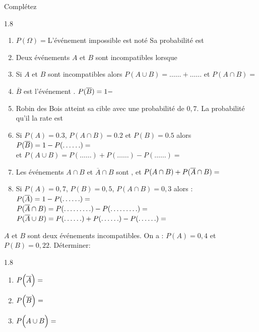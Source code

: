 \documentclass[main.tex]{subfiles}
\begin{document}
\begin{exercise}Complétez \vspace{-0.75em}
\begin{spacing}{1.8}
	\begin{enumerate}[label=\arabic*), leftmargin=*]
		\item $P(\Omega)=$\dotfill L'événement impossible est noté \dotfill Sa probabilité est \dotfill
		\item Deux événements $A$ et $B$ sont incompatibles lorsque \dotfill
		\item Si $A$ et $B$ sont incompatibles alors $P(A\cup B)=\ldots\ldots+\ldots\ldots$ et $P(A\cap B)=$\dotfill 
		\item $\overline{B}$ est l'événement \dotfill. $P(\overline{B})=1-\dotfill$ 
		\item 	Robin des Bois atteint sa cible avec une probabilité de $0,7$. La probabilité qu'il la rate est \dotfill 
		\item Si $P(A)=0.3$, $P(A\cap B)=0.2$  et $P(B)=0.5$  alors \\
		$P(\overline{B})=1-P(\ldots\ldots)=\dotfill$\\
		et  $P(A\cup B)=P(\ldots\ldots) + P(\ldots\ldots) - P(\ldots\ldots)=$\dotfill  
		\item Les événements $A\cap B$ et $\overline{A}\cap B$ sont \dotfill, et $P(A\cap B)+P(\overline{A}\cap B)=\dotfill $
		\item Si $P(A)=0,7$, $P(B)=0,5$, $P(A\cap B)=0,3$ alors :\\ $P(\overline{A})=1-P(\ldots\ldots)=\dotfill$\\
		$P(\overline{A}\cap B)=P(\ldots\ldots\ldots)-P(\ldots\ldots\ldots) =\dotfill $\\
		$P(\overline{A}\cup B)=P(\ldots\ldots)+P(\ldots\ldots)-P(\ldots\ldots)=\dotfill $
	\end{enumerate}
\end{spacing}  \vspace{-0.75em}
\end{exercise}
\begin{exercise} 	$A$ et $B$ sont deux événements incompatibles. On a : $P(A)=0,4$ et $P(B)=0,22$.  Déterminer: \vspace{-0.5em}	  
	\begin{spacing}{1.8}
		\begin{enumerate}[label={}, leftmargin=*] 
			\item $P\Big(\overline{A}\Big)=\dotfill$
			\item $P\Big(\overline{B}\Big)=\dotfill$  
			\item $P\Big(A\cup B\Big)=\dotfill$
		\end{enumerate}
	\end{spacing}  \vspace{-0.75em}	   
\end{exercise}
\end{document}
